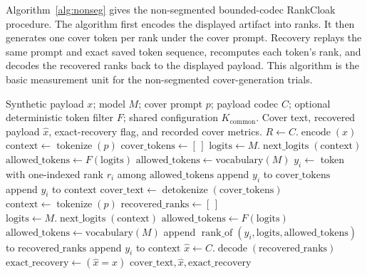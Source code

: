 \documentclass[fleqn,10pt]{wlscirep}
\newcommand{\RankOf}{\operatorname{rank\_of}}
\newcommand{\Encode}{\operatorname{encode}}
\newcommand{\Decode}{\operatorname{decode}}
\newcommand{\Tokenize}{\operatorname{tokenize}}
\newcommand{\Detokenize}{\operatorname{detokenize}}
\newcommand{\NextLogits}{\operatorname{next\_logits}}
\begin{document}
Algorithm~\ref{alg:nonseg} gives the non-segmented bounded-codec RankCloak procedure. The algorithm first encodes the displayed artifact into ranks. It then generates one cover token per rank under the cover prompt. Recovery replays the same prompt and exact saved token sequence, recomputes each token's rank, and decodes the recovered ranks back to the displayed payload. This algorithm is the basic measurement unit for the non-segmented cover-generation trials.

\begin{algorithm}[H]
\caption{Non-segmented RankCloak bounded-codec trial for encoding a displayed synthetic artifact as ranks, generating one cover token per rank, and recovering by exact-copy replay.}
\label{alg:nonseg}
\begin{algorithmic}[1]
\Require Synthetic payload \(x\); model \(M\); cover prompt \(p\); payload codec \(C\); optional deterministic token filter \(F\); shared configuration \(K_{\mathrm{common}}\).
\Ensure Cover text, recovered payload \(\hat{x}\), exact-recovery flag, and recorded cover metrics.
\State \(R \gets C.\Encode(x)\)
\State \(\mathrm{context} \gets \Tokenize(p)\)
\State \(\mathrm{cover\_tokens} \gets [\,]\)
    \State \(\mathrm{logits} \gets M.\NextLogits(\mathrm{context})\)
        \State \(\mathrm{allowed\_tokens} \gets F(\mathrm{logits})\)
    \Else
        \State \(\mathrm{allowed\_tokens} \gets \mathrm{vocabulary}(M)\)
    \EndIf
    \State \(y_i \gets\) token with one-indexed rank \(r_i\) among \(\mathrm{allowed\_tokens}\)
    \State append \(y_i\) to \(\mathrm{cover\_tokens}\)
    \State append \(y_i\) to \(\mathrm{context}\)
\EndFor
\State \(\mathrm{cover\_text} \gets \Detokenize(\mathrm{cover\_tokens})\)
\Statex
\State \(\mathrm{context} \gets \Tokenize(p)\)
\State \(\mathrm{recovered\_ranks} \gets [\,]\)
    \State \(\mathrm{logits} \gets M.\NextLogits(\mathrm{context})\)
        \State \(\mathrm{allowed\_tokens} \gets F(\mathrm{logits})\)
    \Else
        \State \(\mathrm{allowed\_tokens} \gets \mathrm{vocabulary}(M)\)
    \EndIf
    \State append \(\RankOf(y_i,\mathrm{logits},\mathrm{allowed\_tokens})\) to \(\mathrm{recovered\_ranks}\)
    \State append \(y_i\) to \(\mathrm{context}\)
\EndFor
\State \(\hat{x} \gets C.\Decode(\mathrm{recovered\_ranks})\)
\State \(\mathrm{exact\_recovery} \gets (\hat{x}=x)\)
\State \Return \(\mathrm{cover\_text}, \hat{x}, \mathrm{exact\_recovery}\)
\end{algorithmic}
\end{algorithm}
\end{document}
